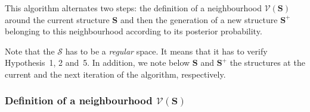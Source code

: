 \documentclass[11pt,a4paper]{article}
\begin{document}
This algorithm alternates two steps: the definition of a neighbourhood $\mathcal{V}(\boldsymbol{S})$ around the current structure $\boldsymbol{S}$ and then the generation of a new structure $\boldsymbol{S}^+$ belonging to this neighbourhood according to its posterior probability.

Note that the $\mathcal{S}$ has to be a {\it regular} space. It means that it has to verify Hypothesis~1, 2 and~5. In addition, we note below $\boldsymbol{S}$ and $\boldsymbol{S}^+$ the structures at the current and the next iteration of the algorithm, respectively.

	\subsubsection{Definition of a neighbourhood $\mathcal{V}(\boldsymbol{S})$}
\end{document}
